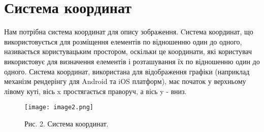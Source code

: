 \chapter{Система координат}\label{cha:coordinate_system}
Нам потрібна система координат для опису зображення.
Cистема координат, що використовується для розміщення елементів по відношенню один до одного, називається користувацьким простором, оскільки це координати, які користувач використовує для визначення елементів і розташування їх по відношенню один до одного.
Система координат, використана для відображення графіки (наприклад механізм рендерінгу для Android та iOS платформ), має початок у верхньому лівому куті, вісь x простягається праворуч, а вісь y - вниз.

\begin{figure}
    \label{fig:image2}
    \centering
    \texttt{[image: image2.png]}

    Рис. 2. Система координат.
\end{figure}

\pagebreak

